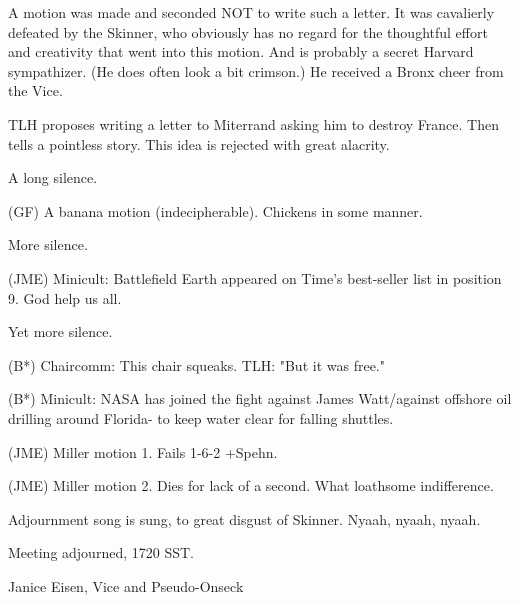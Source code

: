 \documentclass[12pt]{article}
\begin{document}
A motion was made and seconded NOT to write such a letter. It was cavalierly defeated by the Skinner, who obviously has no regard for the thoughtful effort and creativity that went into this motion. And is probably a secret Harvard sympathizer. (He does often look a bit crimson.) He received a Bronx cheer from the Vice.

TLH proposes writing a letter to Miterrand asking him to destroy France. Then tells a pointless story. This idea is rejected with great alacrity.

A long silence.

(GF) A banana motion (indecipherable). Chickens in some manner.

More silence.

(JME) Minicult: Battlefield Earth appeared on Time's best-seller list in position 9. God help us all.

Yet more silence.

(B*) Chaircomm: This chair squeaks. TLH: "But it was free."

(B*) Minicult: NASA has joined the fight against James Watt/against offshore oil drilling around Florida- to keep water clear for falling shuttles.

(JME) Miller motion 1. Fails 1-6-2 +Spehn.

(JME) Miller motion 2. Dies for lack of a second. What loathsome indifference.

Adjournment song is sung, to great disgust of Skinner. Nyaah, nyaah, nyaah.

\vspace{12pt}

\noindent
Meeting adjourned, 1720 SST.

\vspace{18pt}

\centerline{Janice Eisen, Vice and Pseudo-Onseck}
\end{document}
